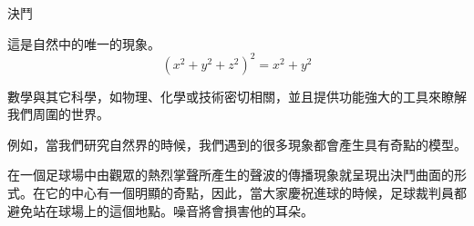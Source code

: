 \begin{surferPage}{決鬥}

這是自然中的唯一的現象。\\
\smallskip
\[(x^2+ y^2+ z^2)^2	= x^2+ y^2\]

\singlespacing

數學與其它科學，如物理、化學或技術密切相關，並且提供功能強大的工具來瞭解我們周圍的世界。

\singlespacing

例如，當我們研究自然界的時候，我們遇到的很多現象都會產生具有奇點的模型。

\singlespacing

在一個足球場中由觀眾的熱烈掌聲所產生的聲波的傳播現象就呈現出決鬥曲面的形式。在它的中心有一個明顯的奇點，因此，當大家慶祝進球的時候，足球裁判員都避免站在球場上的這個地點。噪音將會損害他的耳朵。

\end{surferPage}
